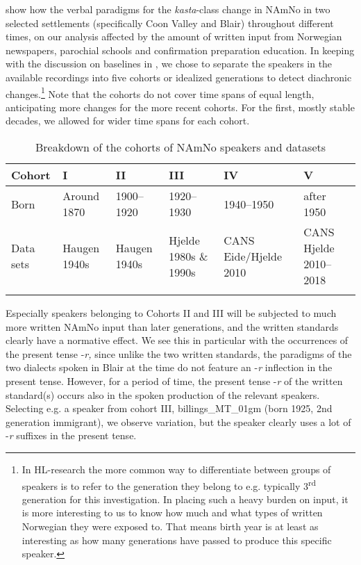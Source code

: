 \documentclass[output=paper]{langscibook}
\begin{document}
\citet{EideHjelde2023} show how the verbal paradigms for the \textit{kasta}{}-class change in NAmNo in two selected settlements (specifically Coon Valley and Blair) throughout different times, on our analysis affected by the amount of written input from Norwegian newspapers, parochial schools and confirmation preparation education. In keeping with the discussion on baselines in , we chose to separate the speakers in the available recordings into five cohorts or idealized generations to detect diachronic changes.\footnote{In HL-research the more common way to differentiate between groups of speakers is to refer to the generation they belong to e.g. typically 3\textsuperscript{rd} generation for this investigation. In placing such a heavy burden on input, it is more interesting to us to know how much and what types of written Norwegian they were exposed to. That means birth year is at least as interesting as how many generations have passed to produce this specific speaker.}   Note that the cohorts do not cover time spans of equal length, anticipating more changes for the more recent cohorts. For the first, mostly stable decades, we allowed for wider time spans for each cohort. 

\begin{table}[h]
\caption{Breakdown of the cohorts of NAmNo speakers and datasets \citep{EideHjelde2023}}
\label{tab:eide:cohorts}
\begin{tabularx}{\textwidth}{l *5{Q}}
\lsptoprule
Cohort & I & II & III & IV & V\\\midrule
Born & Around 1870 & 1900--1920 & 1920--1930 & 1940--1950 & after 1950\\
Data sets & Haugen 1940s & Haugen 1940s & Hjelde 1980s \& 1990s & CANS Eide\slash Hjelde 2010 & CANS Hjelde 2010--2018\\
\lspbottomrule
\end{tabularx}
\end{table}

Especially speakers belonging to Cohorts II and III will be subjected to much more written NAmNo input than later generations, and the written standards clearly have a normative effect. We see this in particular with the occurrences of the present tense -\textit{r,} since unlike the two written standards, the paradigms of the two dialects spoken in Blair at the time do not feature an -\textit{r} inflection in the present tense. However, for a period of time, the present tense -\textit{r} of the written standard(s) occurs also in the spoken production of the relevant speakers. Selecting e.g. a speaker from cohort III, billings\_MT\_01gm (born 1925, 2nd generation immigrant), we observe variation, but the speaker clearly uses a lot of -\textit{r} suffixes in the present tense. 
\end{document}
